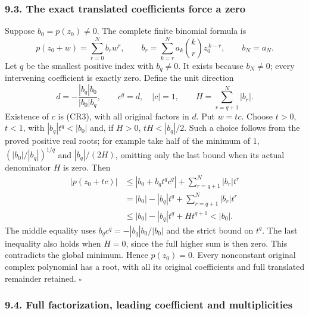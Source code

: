\documentclass[
  11pt,
]{article}
\begin{document}
\subsubsection{9.3. The exact translated coefficients force a
zero}\label{the-exact-translated-coefficients-force-a-zero}

Suppose \(b_0=p(z_0)\ne0\). The complete finite binomial formula is \[
 p(z_0+w)=\sum_{r=0}^N b_r w^r,\qquad
 b_r=\sum_{k=r}^N a_k\binom{k}{r}z_0^{\,k-r},\qquad b_N=a_N.
                                                               \tag{CR8}
\] Let \(q\) be the smallest positive index with \(b_q\ne0\). It exists
because \(b_N\ne0\); every intervening coefficient is exactly zero.
Define the unit direction \[
 d=-\frac{|b_q|b_0}{|b_0|b_q},\qquad
 c^q=d,\quad |c|=1,\qquad H=\sum_{r=q+1}^N|b_r|.                \tag{CR9}
\] Existence of \(c\) is (CR3), with all original factors in \(d\). Put
\(w=tc\). Choose \(t>0\), \(t<1\), with \(|b_q|t^q<|b_0|\) and, if
\(H>0\), \(tH<|b_q|/2\). Such a choice follows from the proved positive
real roots; for example take half of the minimum of \(1\),
\((|b_0|/|b_q|)^{1/q}\) and \(|b_q|/(2H)\), omitting only the last bound
when its actual denominator \(H\) is zero. Then \[
 \begin{split}
 |p(z_0+tc)|
 &\leq |b_0+b_qt^qc^q|+\sum_{r=q+1}^N|b_r|t^r\\
 &= |b_0|-|b_q|t^q+\sum_{r=q+1}^N|b_r|t^r\\
 &\leq |b_0|-|b_q|t^q+Ht^{q+1}<|b_0| .                       
 \end{split} \tag{CR10}
\] The middle equality uses \(b_qc^q=-|b_q|b_0/|b_0|\) and the strict
bound on \(t^q\). The last inequality also holds when \(H=0\), since the
full higher sum is then zero. This contradicts the global minimum. Hence
\(p(z_0)=0\). Every nonconstant original complex polynomial has a root,
with all its original coefficients and full translated remainder
retained. \(\square\)

\subsubsection{9.4. Full factorization, leading coefficient and
multiplicities}\label{full-factorization-leading-coefficient-and-multiplicities}
\end{document}
